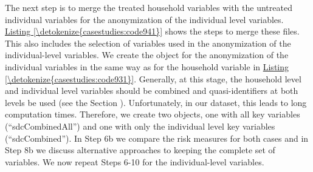 \documentclass[letterpaper,10pt,english]{sphinxmanual}
\begin{document}
The next step is to merge the treated household variables with the
untreated individual variables for the anonymization of the individual
level variables. \hyperref[\detokenize{casestudies:code941}]{Listing \ref{\detokenize{casestudies:code941}}} shows the steps to merge these files. This
also includes the selection of variables used in the anonymization of
the individual-level variables. We create the  object for the
anonymization of the individual variables in the same way as for the
household variable in \hyperref[\detokenize{casestudies:code931}]{Listing \ref{\detokenize{casestudies:code931}}}. Generally, at this stage, the
household level and individual level variables should be combined and
quasi-identifiers at both levels be used (see the Section ).
Unfortunately, in our dataset, this leads to long computation times.
Therefore, we create two  objects, one with all key variables
(“sdcCombinedAll”) and one with only the individual level key variables
(“sdcCombined”). In Step 6b we compare the risk measures for both cases
and in Step 8b we discuss alternative approaches to keeping the complete
set of variables. We now repeat Steps 6-10 for the individual-level
variables.
\end{document}
